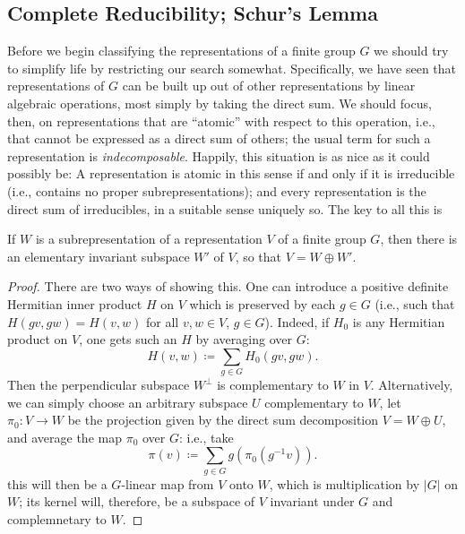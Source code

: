 \subsection{Complete Reducibility; Schur's Lemma}
Before we begin classifying the representations of a finite group $G$ we
should try to simplify life by restricting our search
somewhat. Specifically, we have seen that representations of $G$ can be
built up out of other representations by linear algebraic operations, most
simply by taking the direct sum. We should focus, then, on representations
that are ``atomic'' with respect to this operation, i.e., that cannot be
expressed as a direct sum of others; the usual term for such a
representation is \emph{indecomposable}. Happily, this situation is as nice
as it could possibly be: A representation is atomic in this sense if and
only if it is irreducible (i.e., contains no proper subrepresentations);
and every representation is the direct sum of irreducibles, in a suitable
sense uniquely so. The key to all this is
\begin{proposition}
If $W$ is a subrepresentation of a representation $V$ of a finite group
$G$, then there is an elementary invariant subspace $W'$ of $V$, so that
$V=W\oplus W'$.
\end{proposition}
\begin{proof}
  There are two ways of showing this. One can introduce a positive definite
  Hermitian inner product $H$ on $V$ which is preserved by each $g\in G$
  (i.e., such that $H(gv,gw)=H(v,w)$ for all $v,w\in V$,
  $g\in G$). Indeed, if $H_0$ is any Hermitian product on $V$, one gets
  such an $H$ by averaging over $G$:
  \begin{equation}
    \label{eq:1:hermitian-inn-prod}
    H(v,w)\coloneqq\sum_{g\in G}H_0(gv,gw).
  \end{equation}
  Then the perpendicular subspace $W^\perp$ is complementary to $W$ in
  $V$. Alternatively, we can simply choose an arbitrary subspace $U$
  complementary to $W$, let $\pi_0\colon V\to W$ be the projection given by
  the direct sum decomposition $V=W\oplus U$, and average the map $\pi_0$
  over $G$: i.e., take
  \begin{equation}
    \label{eq:1:averaging-map}
    \pi(v)\coloneqq\sum_{g\in G}g(\pi_0(g^{-1}v)).
  \end{equation}
  this will then be a $G$-linear map from $V$ onto $W$, which is
  multiplication by $|G|$ on $W$; its kernel will, therefore, be a subspace
  of $V$ invariant under $G$ and complemnetary to $W$.
\end{proof}

